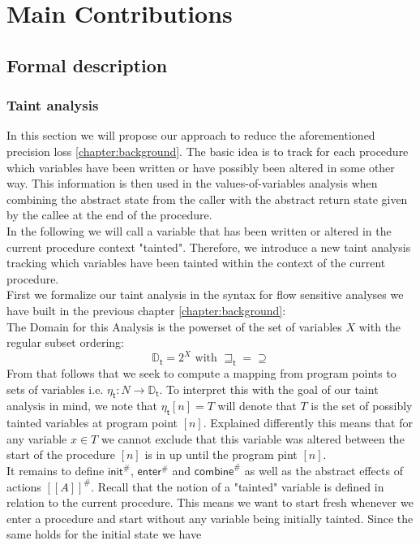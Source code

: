 
\chapter{Main Contributions}\label{chapter:mainContributions}

  \section{Formal description}
    \subsection{Taint analysis}
      In this section we will propose our approach to reduce the aforementioned precision loss \ref{chapter:background}. The basic idea is to track for each procedure which variables have been written or have possibly been altered in some other way. This information is then used in the values-of-variables analysis when combining the abstract state from the caller with the abstract return state given by the callee at the end of the procedure.\\
      In the following we will call a variable that has been written or altered in the current procedure context "tainted". Therefore, we introduce a new taint analysis tracking which variables have been tainted within the context of the current procedure.\\
      First we formalize our taint analysis in the syntax for flow sensitive analyses we have built in the previous chapter \ref{chapter:background}:\\
      The Domain for this Analysis is the powerset of the set of variables $X$ with the regular subset ordering:
      \[\mathbb{D}_\textsf{t} = 2^X \text{ with } \sqsupseteq_\textsf{t} = \supseteq\]
      From that follows that we seek to compute a mapping from program points to sets of variables i.e. $\eta_\textsf{t}: N \rightarrow \mathbb{D}_\textsf{t}$. To interpret this with the goal of our taint analysis in mind, we note that $\eta_\textsf{t} [n] = T$ will denote that $T$ is the set of possibly tainted variables at program point $[n]$. Explained differently this means that for any variable $x \in T$ we cannot exclude that this variable was altered between the start of the procedure $[n]$ is in up until the program pint $[n]$.\\
      It remains to define $\textsf{init}^{\#}$, $\textsf{enter}^{\#}$ and $\textsf{combine}^{\#}$ as well as the abstract effects of actions $[\![  A ]\!]^{\#}$. Recall that the notion of a "tainted" variable is defined in relation to the current procedure. This means we want to start fresh whenever we enter a procedure and start without any variable being initially tainted. Since the same holds for the initial state we have 
